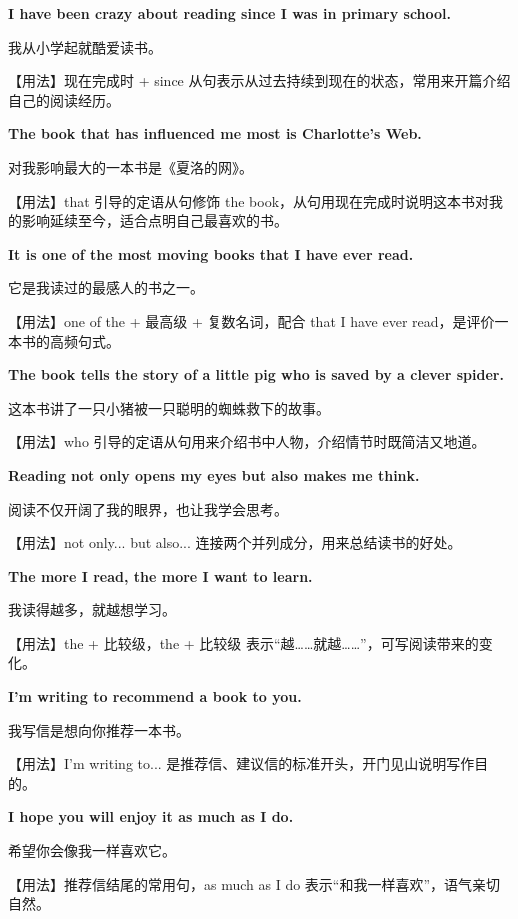 \documentclass[UTF8,a4paper,11pt,oneside]{ctexbook}
\newcommand{\fansection}[1]{%
  \par\addvspace{2.4ex}%
  \Needspace{6\baselineskip}%
  \noindent{\sffamily\Large\bfseries\color{mainblue}#1}\par
  \nopagebreak
  \addvspace{0.2ex}%
  \noindent{\color{rulelight}\rule{\linewidth}{0.9pt}}\par
  \addvspace{0.9ex}%
  \nobreak
}
\newcommand{\fanpat}[3]{%
  \item{\bfseries #1}\par\nopagebreak
  {\small\color{textgray}#2}\par\nopagebreak
  {\footnotesize\color{accent!90!black}【用法】#3}\par
}
\begin{document}
\fansection{〇、本单元写作常用句型}
\begin{fanpatterns}
\fanpat{I have been crazy about reading since I was in primary school.}{我从小学起就酷爱读书。}{现在完成时 + since 从句表示从过去持续到现在的状态，常用来开篇介绍自己的阅读经历。}

\fanpat{The book that has influenced me most is Charlotte's Web.}{对我影响最大的一本书是《夏洛的网》。}{that 引导的定语从句修饰 the book，从句用现在完成时说明这本书对我的影响延续至今，适合点明自己最喜欢的书。}

\fanpat{It is one of the most moving books that I have ever read.}{它是我读过的最感人的书之一。}{one of the + 最高级 + 复数名词，配合 that I have ever read，是评价一本书的高频句式。}

\fanpat{The book tells the story of a little pig who is saved by a clever spider.}{这本书讲了一只小猪被一只聪明的蜘蛛救下的故事。}{who 引导的定语从句用来介绍书中人物，介绍情节时既简洁又地道。}

\fanpat{Reading not only opens my eyes but also makes me think.}{阅读不仅开阔了我的眼界，也让我学会思考。}{not only... but also... 连接两个并列成分，用来总结读书的好处。}

\fanpat{The more I read, the more I want to learn.}{我读得越多，就越想学习。}{the + 比较级，the + 比较级 表示“越……就越……”，可写阅读带来的变化。}

\fanpat{I'm writing to recommend a book to you.}{我写信是想向你推荐一本书。}{I'm writing to... 是推荐信、建议信的标准开头，开门见山说明写作目的。}

\fanpat{I hope you will enjoy it as much as I do.}{希望你会像我一样喜欢它。}{推荐信结尾的常用句，as much as I do 表示“和我一样喜欢”，语气亲切自然。}

\end{fanpatterns}

\fansection{一、满分范文}
\end{document}
